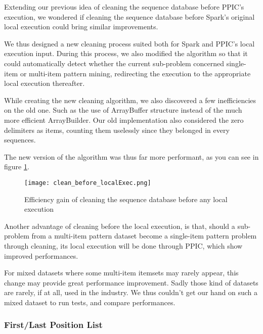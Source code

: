 \documentclass{eplmastersthesis}
\begin{document}
Extending our previous idea of cleaning the sequence database before PPIC's execution, we wondered if cleaning the sequence database before Spark's original local execution could bring similar improvements. \newline

We thus designed a new cleaning process suited both for Spark and PPIC's local execution input. During this process, we also modified the algorithm so that it could automatically detect whether the current sub-problem concerned single-item or multi-item pattern mining, redirecting the execution to the appropriate local execution thereafter. \newline

While creating the new cleaning algorithm, we also discovered a few inefficiencies on the old one. Such as the use of ArrayBuffer structure instead of the much more efficient ArrayBuilder. Our old implementation also considered the zero delimiters as items, counting them uselessly since they belonged in every sequences. \newline

The new version of the algorithm was thus far more performant, as you can see in figure \ref{fig:cleaning_before_local_exec}. \newline

\begin{figure}[h]
  \centering
  \texttt{[image: clean\_before\_localExec.png]}
  \caption{Efficiency gain of cleaning the sequence database before any local execution}
  \label{fig:cleaning_before_local_exec}
\end{figure}

Another advantage of cleaning before the local execution, is that, should a sub-problem from a multi-item pattern dataset become a single-item pattern problem through cleaning, its local execution will be done through PPIC, which show improved performances. \newline

For mixed datasets where some multi-item itemsets may rarely appear, this change may provide great performance improvement. Sadly those kind of datasets are rarely, if at all, used in the industry. We thus couldn't get our hand on such a mixed dataset to run tests, and compare performances.

\subsubsection{First/Last Position List}
\end{document}
